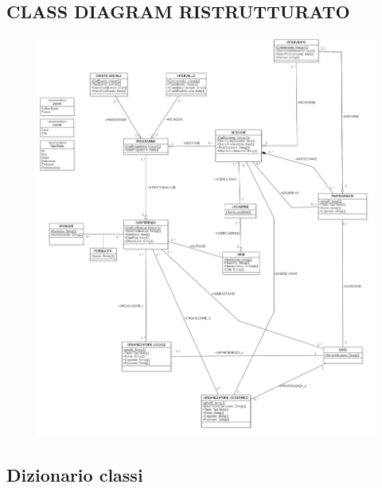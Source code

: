 \documentclass[a4page]{article}
\begin{document}
\subsection{CLASS DIAGRAM RISTRUTTURATO}
\begin{figure}[h!]
\includegraphics[width=18cm]{CSR}
\end{figure}


\subsection{Dizionario classi}
\end{document}
